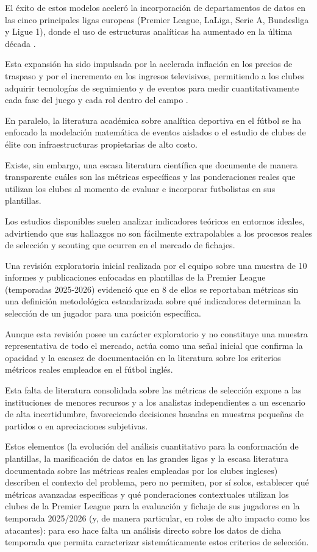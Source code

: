 El éxito de estos modelos aceleró la incorporación de departamentos de datos en las cinco principales ligas europeas (Premier League, LaLiga, Serie A, Bundesliga y Ligue 1), donde el uso de estructuras analíticas ha aumentado en la última década \cite{felipe2023integracion}. 

Esta expansión ha sido impulsada por la acelerada inflación en los precios de traspaso y por el incremento en los ingresos televisivos, permitiendo a los clubes adquirir tecnologías de seguimiento y de eventos para medir cuantitativamente cada fase del juego y cada rol dentro del campo \cite{gonzalez2022estimacion}.

En paralelo, la literatura académica sobre analítica deportiva en el fútbol se ha enfocado la modelación matemática de eventos aislados o el estudio de clubes de élite con infraestructuras propietarias de alto costo. 

Existe, sin embargo, una escasa literatura científica que documente de manera transparente cuáles son las métricas específicas y las ponderaciones reales que utilizan los clubes al momento de evaluar e incorporar futbolistas en sus plantillas. 

Los estudios disponibles suelen analizar indicadores teóricos en entornos ideales, advirtiendo que sus hallazgos no son fácilmente extrapolables a los procesos reales de selección y scouting que ocurren en el mercado de fichajes.

Una revisión exploratoria inicial realizada por el equipo sobre una muestra de 10 informes y publicaciones enfocadas en plantillas de la Premier League (temporadas 2025-2026) evidenció que en 8 de ellos se reportaban métricas sin una definición metodológica estandarizada sobre qué indicadores determinan la selección de un jugador para una posición específica. 

Aunque esta revisión posee un carácter exploratorio y no constituye una muestra representativa de todo el mercado, actúa como una señal inicial que confirma la opacidad y la escasez de documentación en la literatura sobre los criterios métricos reales empleados en el fútbol inglés.

Esta falta de literatura consolidada sobre las métricas de selección expone a las instituciones de menores recursos y a los analistas independientes a un escenario de alta incertidumbre, favoreciendo decisiones basadas en muestras pequeñas de partidos o en apreciaciones subjetivas.

Estos elementos (la evolución del análisis cuantitativo para la conformación de plantillas, la masificación de datos en las grandes ligas y la escasa literatura documentada sobre las métricas reales empleadas por los clubes ingleses) describen el contexto del problema, pero no permiten, por sí solos, establecer qué métricas avanzadas específicas y qué ponderaciones contextuales utilizan los clubes de la Premier League para la evaluación y fichaje de sus jugadores en la temporada 2025/2026 (y, de manera particular, en roles de alto impacto como los atacantes): para eso hace falta un análisis directo sobre los datos de dicha temporada que permita caracterizar sistemáticamente estos criterios de selección.

